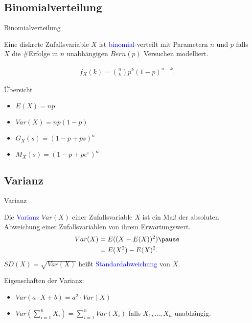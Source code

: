 \documentclass{beamer}
\def\padding{\vspace{0.5cm}}
\def\b{\textcolor{blue}}
\begin{document}
\subsection{Binomialverteilung}
\begin{frame}{Binomialverteilung}
    \begin{definition}
        Eine diskrete Zufallsvariable $X$ ist \b{binomial}-verteilt mit Parametern $n$ und $p$ falls $X$ die \#Erfolge in $n$ unabhängigen $Bern(p)$ Versuchen modelliert.
    \end{definition}\pause
    \begin{align*}
        f_X(k) = {n \choose k} p^k (1 - p)^{n-k}.
    \end{align*}\pause
    \begin{exampleblock}{Übersicht}
        \begin{itemize}
            \item $E(X) = n p$\pause
            \item $Var(X) = n p (1 - p)$
            \item $G_X(s) = (1 - p + p s)^n$
            \item $M_X(s) = (1 - p + p e^s)^n$
        \end{itemize}
    \end{exampleblock}
\end{frame}

\subsection{Varianz}
\begin{frame}{Varianz}
    \begin{definition}
        Die \b{Varianz} $Var(X)$ einer Zufallsvariable $X$ ist ein Maß der absoluten Abweichung einer Zufallsvariablen von ihrem Erwartungswert.
        \begin{align*}
            Var(X) &= E((X - E(X))^2)\pause \\
                   &= E(X^2) - E(X)^2.
        \end{align*}\pause
        $SD(X) = \sqrt{Var(X)}$ heißt \b{Standardabweichung} von $X$.
    \end{definition}\pause\par\padding
    Eigenschaften der Varianz:\pause
    \begin{itemize}
        \item $Var(a \cdot X + b) = a^2 \cdot Var(X)$\pause
        \item $Var(\sum_{i=1}^n X_i) = \sum_{i=1}^n Var(X_i)$ falls $X_1, \dots, X_n$ unabhängig.
    \end{itemize}
\end{frame}
\end{document}
